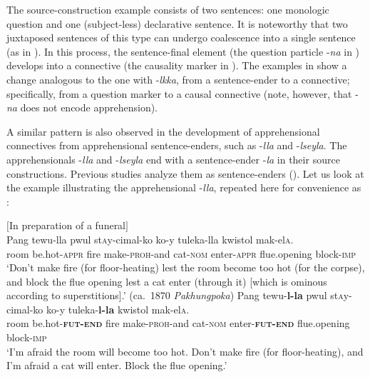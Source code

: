 \documentclass[output=paper,colorlinks,citecolor=brown]{langscibook}
\begin{document}
\noindent The source-construction example  consists of two sentences: one monologic question and one (subject-less) declarative sentence. It is noteworthy that two juxtaposed sentences of this type can undergo coalescence \citep{Haspelmath2011} into a single sentence (as in ). In this process, the sentence-final element (the question particle \nobreakdash-\textit{na} in ) develops into a connective (the causality marker in ). The examples in  show a change analogous to the one with \nobreakdash-\textit{lkka}, from a sentence-ender to a connective; specifically, from a question marker to a causal connective (note, however, that \nobreakdash-\textit{na} does not encode apprehension).

A similar pattern is also observed in the development of apprehensional connectives from apprehensional sentence-enders, such as \nobreakdash-\textit{lla} and \nobreakdash-\textit{lseyla}.  The apprehensionals \nobreakdash-\textit{lla} and \nobreakdash-\textit{lseyla} end with a sentence-ender \nobreakdash-\textit{la} in their source constructions. Previous studies analyze them as sentence-enders (\citealt{Ramstedt1997,Kim1960,Ko2002,Jang2002}). Let us look at the example  illustrating the apprehensional \nobreakdash-\textit{lla}, repeated here for convenience as :



\ea \label{ex:RK20}
\ea \label{ex:RK20a} \textnormal{$[$In preparation of a funeral$]$} \\
\gll Pang tewu-lla pwul st\textsc{a}y-cimal-ko ko-y tuleka-lla kwistol mak-el\textsc{a}. \\
room be.hot-\textsc{appr} fire make-\textsc{proh}-and cat-\textsc{nom} enter-\textsc{appr} flue.opening block-\textsc{imp} \\
\glt `Don't make fire (for floor-heating) lest the room become too hot (for the corpse), and block the flue opening lest a cat enter (through it) [which is ominous according to superstitions].' (ca.\ 1870 \textit{Pakhungpoka})
\ex \label{ex:RK20b}
\gll Pang tewu-\textbf{l-la} pwul st\textsc{a}y-cimal-ko ko-y tuleka-\textbf{l-la} kwistol mak-el\textsc{a}. \\
room be.hot-\textsc{\textbf{fut-end}} fire make-\textsc{proh}-and cat-\textsc{nom} enter-\textsc{\textbf{fut-end}} flue.opening block-\textsc{imp} \\
\glt `I'm afraid the room will become too hot. Don't make fire (for floor-heating), and I'm afraid a cat will enter. Block the flue opening.'
\z
\z
\end{document}
